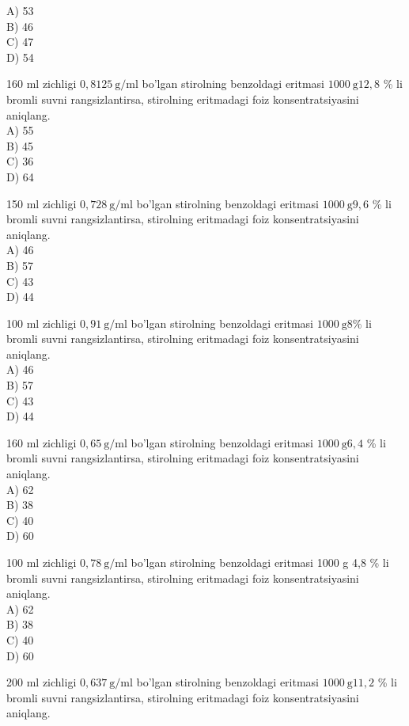 A) 53\\
B) 46\\
C) 47\\
D) 54
  \item 160 ml zichligi $0,8125 \mathrm{~g} / \mathrm{ml}$ bo'lgan stirolning benzoldagi eritmasi $1000 \mathrm{~g} 12,8$ \% li bromli suvni rangsizlantirsa, stirolning eritmadagi foiz konsentratsiyasini aniqlang.\\
A) 55\\
B) 45\\
C) 36\\
D) 64
  \item 150 ml zichligi $0,728 \mathrm{~g} / \mathrm{ml}$ bo'lgan stirolning benzoldagi eritmasi $1000 \mathrm{~g} 9,6$ \% li bromli suvni rangsizlantirsa, stirolning eritmadagi foiz konsentratsiyasini aniqlang.\\
A) 46\\
B) 57\\
C) 43\\
D) 44
  \item 100 ml zichligi $0,91 \mathrm{~g} / \mathrm{ml}$ bo'lgan stirolning benzoldagi eritmasi $1000 \mathrm{~g} 8 \%$ li bromli suvni rangsizlantirsa, stirolning eritmadagi foiz konsentratsiyasini aniqlang.\\
A) 46\\
B) 57\\
C) 43\\
D) 44
  \item 160 ml zichligi $0,65 \mathrm{~g} / \mathrm{ml}$ bo'lgan stirolning benzoldagi eritmasi $1000 \mathrm{~g} 6,4$ \% li bromli suvni rangsizlantirsa, stirolning eritmadagi foiz konsentratsiyasini aniqlang.\\
A) 62\\
B) 38\\
C) 40\\
D) 60
  \item 100 ml zichligi $0,78 \mathrm{~g} / \mathrm{ml}$ bo'lgan stirolning benzoldagi eritmasi 1000 g 4,8 \% li bromli suvni rangsizlantirsa, stirolning eritmadagi foiz konsentratsiyasini aniqlang.\\
A) 62\\
B) 38\\
C) 40\\
D) 60
  \item 200 ml zichligi $0,637 \mathrm{~g} / \mathrm{ml}$ bo'lgan stirolning benzoldagi eritmasi $1000 \mathrm{~g} 11,2$ \% li bromli suvni rangsizlantirsa, stirolning eritmadagi foiz konsentratsiyasini aniqlang.\\
